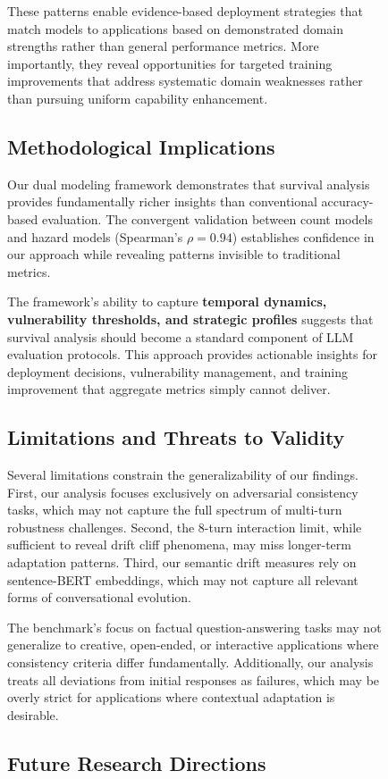 \documentclass[letterpaper]{article}
\begin{document}
\begin{figure}[ht]
These patterns enable evidence-based deployment strategies that match models to applications based on demonstrated domain strengths rather than general performance metrics. More importantly, they reveal opportunities for targeted training improvements that address systematic domain weaknesses rather than pursuing uniform capability enhancement.

\subsection{Methodological Implications}

Our dual modeling framework demonstrates that survival analysis provides fundamentally richer insights than conventional accuracy-based evaluation. The convergent validation between count models and hazard models (Spearman's $\rho = 0.94$) establishes confidence in our approach while revealing patterns invisible to traditional metrics.

The framework's ability to capture \textbf{temporal dynamics, vulnerability thresholds, and strategic profiles} suggests that survival analysis should become a standard component of LLM evaluation protocols. This approach provides actionable insights for deployment decisions, vulnerability management, and training improvement that aggregate metrics simply cannot deliver.

\subsection{Limitations and Threats to Validity}

Several limitations constrain the generalizability of our findings. First, our analysis focuses exclusively on adversarial consistency tasks, which may not capture the full spectrum of multi-turn robustness challenges. Second, the 8-turn interaction limit, while sufficient to reveal drift cliff phenomena, may miss longer-term adaptation patterns. Third, our semantic drift measures rely on sentence-BERT embeddings, which may not capture all relevant forms of conversational evolution.

The benchmark's focus on factual question-answering tasks may not generalize to creative, open-ended, or interactive applications where consistency criteria differ fundamentally. Additionally, our analysis treats all deviations from initial responses as failures, which may be overly strict for applications where contextual adaptation is desirable.

\subsection{Future Research Directions}


\end{figure}
\end{document}
